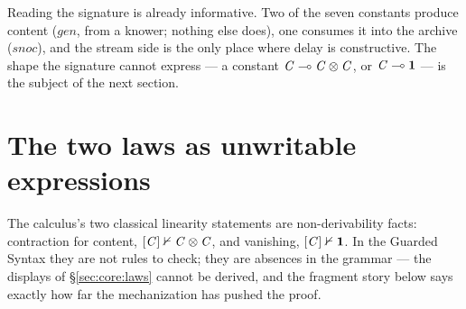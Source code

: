 \documentclass{eptcs}
\begin{document}
Reading the signature is already informative. Two of the seven constants
produce content ($\mathit{gen}$, from a knower; nothing else does), one
consumes it into the archive ($\mathit{snoc}$), and the stream side is
the only place where delay is constructive. The shape the signature
cannot express --- a constant $\mathit{C} \multimap \mathit{C} \otimes \mathit{C}$, or $\mathit{C} \multimap
\mathbf{1}$ --- is the subject of the next section.

\section{The two laws as unwritable expressions}\label{sec:laws}

The calculus's two classical linearity statements are non-derivability
facts: contraction for content, $[\mathit{C}] \nvdash \mathit{C} \otimes \mathit{C}$, and
vanishing, $[\mathit{C}] \nvdash \mathbf{1}$. In the Guarded Syntax they are not
rules to check; they are absences in the grammar --- the displays of
\S\ref{sec:core:laws} cannot be derived, and the fragment story below
says exactly how far the mechanization has pushed the proof.
\end{document}
